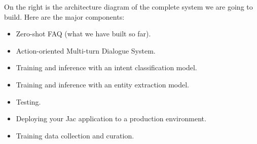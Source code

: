 On the right is the architecture diagram of the complete system we are
going to build. Here are the major components:

\begin{itemize}
    \tightlist
    \item
          Zero-shot FAQ (what we have built so far).
    \item
          Action-oriented Multi-turn Dialogue System.
    \item
          Training and inference with an intent classification model.
    \item
          Training and inference with an entity extraction model.
    \item
          Testing.
    \item
          Deploying your Jac application to a production environment.
    \item
          Training data collection and curation.
\end{itemize}
